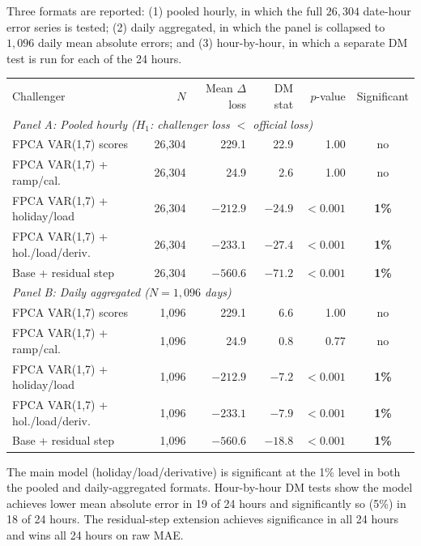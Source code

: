 \documentclass[10pt,a4paper]{article}
\begin{document}
Three formats are reported: (1) pooled hourly, in which the full \(26{,}304\) date-hour error series is tested; (2) daily aggregated, in which the panel is collapsed to \(1{,}096\) daily mean absolute errors; and (3) hour-by-hour, in which a separate DM test is run for each of the 24 hours.

\begin{center}
\fontsize{7.8}{9.0}\selectfont
\begin{tabular}{p{}rrrrc}
\toprule
Challenger & $N$ & Mean $\Delta$ loss & DM stat & $p$-value & Significant\\
\multicolumn{6}{l}{\textit{Panel A: Pooled hourly (\(H_1\): challenger loss \(<\) official loss)}}\\
\midrule
FPCA VAR(1,7) scores         & 26{,}304 &  229.1 &  22.9 & 1.00 & no\\
FPCA VAR(1,7) + ramp/cal.    & 26{,}304 &   24.9 &   2.6 & 1.00 & no\\
FPCA VAR(1,7) + holiday/load & 26{,}304 & \(-212.9\) & \(-24.9\) & \(< 0.001\) & \textbf{1\%}\\
FPCA VAR(1,7) + hol./load/deriv. & 26{,}304 & \(-233.1\) & \(-27.4\) & \(< 0.001\) & \textbf{1\%}\\
Base + residual step         & 26{,}304 & \(-560.6\) & \(-71.2\) & \(< 0.001\) & \textbf{1\%}\\
\midrule
\multicolumn{6}{l}{\textit{Panel B: Daily aggregated (\(N = 1{,}096\) days)}}\\
\midrule
FPCA VAR(1,7) scores         & 1{,}096 &  229.1 &   6.6 & 1.00 & no\\
FPCA VAR(1,7) + ramp/cal.    & 1{,}096 &   24.9 &   0.8 & 0.77 & no\\
FPCA VAR(1,7) + holiday/load & 1{,}096 & \(-212.9\) & \(-7.2\) & \(< 0.001\) & \textbf{1\%}\\
FPCA VAR(1,7) + hol./load/deriv. & 1{,}096 & \(-233.1\) & \(-7.9\) & \(< 0.001\) & \textbf{1\%}\\
Base + residual step         & 1{,}096 & \(-560.6\) & \(-18.8\) & \(< 0.001\) & \textbf{1\%}\\
\bottomrule
\end{tabular}
\end{center}

\fontsize{9.2}{10.8}\selectfont

\noindent The main model (holiday/load/derivative) is significant at the 1\% level in both the pooled and daily-aggregated formats. Hour-by-hour DM tests show the model achieves lower mean absolute error in 19 of 24 hours and significantly so (5\%) in 18 of 24 hours. The residual-step extension achieves significance in all 24 hours and wins all 24 hours on raw MAE.
\end{document}
